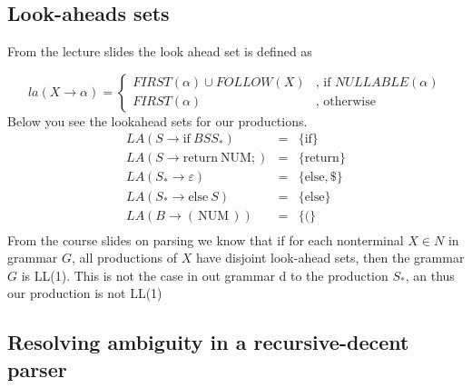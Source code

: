 \documentclass[11pt,a4paper]{article}
\begin{document}
\subsection{Look-aheads sets}

From the lecture slides the look ahead set is defined as

$$la(X\rightarrow\alpha)=
\begin{cases}
    FIRST(\alpha)\cup FOLLOW(X) & \textrm{, if }NULLABLE(\alpha)\\
    FIRST(\alpha)               & \textrm{, otherwise}
\end{cases}$$
Below you see the lookahead sets for our productions.
$$
\begin{array}{lcl}
    LA(S   \rightarrow  \mathrm{if\:}BSS_*)     & = &      \{\mathrm{if}\} \\
    LA(S   \rightarrow  \mathrm{return\:NUM;})  & = &      \{\mathrm{return}\} \\
    LA(S_* \rightarrow  \varepsilon)            & = &      \{\mathrm{else,} \$\} \\
    LA(S_* \rightarrow  \mathrm{else}\:S)       & = &      \{\mathrm{else}\} \\
    LA(B   \rightarrow  \mathrm{(\,NUM\,)})     & = &      \{\mathrm{(}\} \\
\end{array}
$$
From the course slides on parsing we know that if for each nonterminal $X
\in N$ in grammar $G$, all productions of $X$ have disjoint look-ahead sets,
then the grammar $G$ is LL(1). This is not the case in out grammar d to the
production $S_*$, an thus our production is not LL(1)

\subsection{Resolving ambiguity in a recursive-decent parser}
\end{document}
